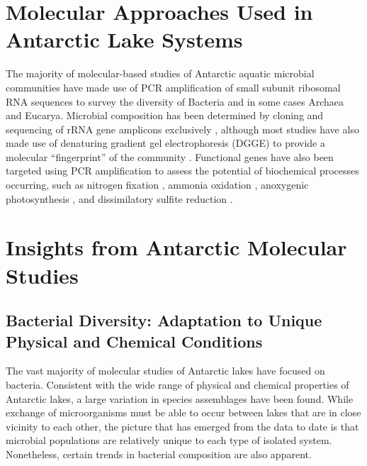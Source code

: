 \section{Molecular Approaches Used in Antarctic Lake Systems}
\label{in:mol}
The majority of molecular-based studies of Antarctic aquatic microbial communities have made use of PCR amplification of small subunit ribosomal RNA sequences to survey the diversity of Bacteria
 and in some cases Archaea and Eucarya. %
Microbial composition has been determined by cloning and sequencing of rRNA gene amplicons exclusively 
\cite{Bowman2000a, Bowman2000, Gordon2000, Christner2001, Purdy2003, Karr2006, Matsuzaki2006, Kurosawa2010,Bielewicz2011}, 
although most studies have also made use of denaturing gradient gel electrophoresis (DGGE) to provide a molecular ``fingerprint'' of the community 
\cite{Pearce2003, Pearce2003, Karr2005, Pearce2005, Pearce2005, Unrein2005, Glatz2006, Mikucki2007, Mosier2007, Schiaffino2009, Villaescusa2010}.
Functional genes have also been targeted using PCR amplification to assess the potential of biochemical processes occurring, such as nitrogen fixation \cite{Olsen1998}, 
ammonia oxidation \cite{Voytek1999}, anoxygenic photosynthesis \cite{Karr2003}, and dissimilatory sulfite reduction \cite{Karr2005, Mikucki2009}. %


\section{Insights from Antarctic Molecular Studies}
\label{in:insights}
\subsection{Bacterial Diversity: Adaptation to Unique Physical and Chemical Conditions}
The vast majority of molecular studies of Antarctic lakes have focused on bacteria.
Consistent with the wide range of physical and chemical properties of Antarctic lakes, a large variation in species assemblages have been found.
While exchange of microorganisms must be able to occur between lakes that are in close vicinity to each other, 
the picture that has emerged from the data to date is that microbial populations are relatively unique to each type of isolated system. 
Nonetheless, certain trends in bacterial composition are also apparent.

